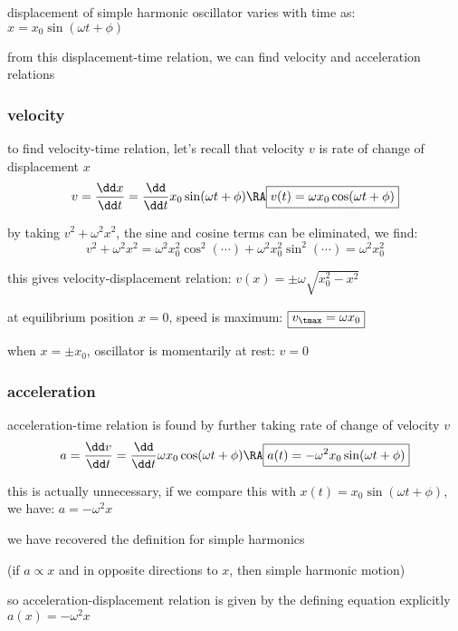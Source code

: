 displacement of simple harmonic oscillator varies with time as: $x=x_0\sin(\omega t + \phi)$

from this displacement-time relation, we can find velocity and acceleration relations

\subsubsection*{velocity}

to find velocity-time relation, let's recall that velocity $v$ is rate of change of displacement $x$
\begin{equation*}
	v = \frac{\dd x}{\dd t} = \frac{\dd}{\dd t} x_0\sin(\omega t+\phi) \RA \boxed{v(t) = \omega x_0 \cos(\omega t+\phi)}
\end{equation*}

by taking $v^2 + \omega^2 x^2$, the sine and cosine terms can be eliminated, we find:
\begin{equation*}
	v^2 + \omega^2 x^2 = \omega^2 x_0^2 \cos^2(\cdots) + \omega^2 x_0^2 \sin^2(\cdots) = \omega^2 x_0^2
\end{equation*}

this gives velocity-displacement relation: $\boxed{v(x)=\pm \omega\sqrt{x_0^2 - x^2}}$

\cmt at equilibrium position $x=0$, speed is maximum: $\boxed{v_\tmax = \omega x_0}$ 

\cmt when $x=\pm x_0$, oscillator is momentarily at rest: $v=0$ 

\subsubsection*{acceleration}

acceleration-time relation is found by further taking rate of change of velocity $v$
\begin{equation*}
a = \frac{\dd v}{\dd t} = \frac{\dd}{\dd t} \omega x_0 \cos(\omega t+\phi) \RA \boxed{a(t) = - \omega^2 x_0 \sin(\omega t+\phi)}
\end{equation*}

this is actually unnecessary, if we compare this with $x(t)=x_0 \sin(\omega t+\phi)$, we have: $a=-\omega^2 x$

we have recovered the definition for simple harmonics

(if $a \propto x$ and in opposite directions to $x$, then simple harmonic motion)

so acceleration-displacement relation is given by the defining equation explicitly $\boxed{a(x) = -\omega^2 x} $

